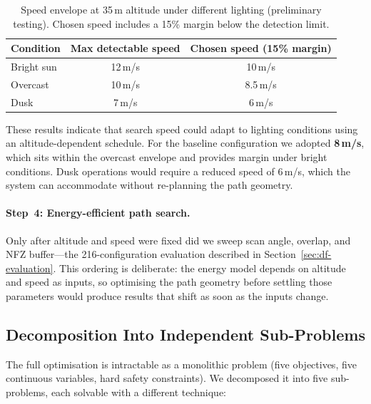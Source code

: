 \begin{table}[H]
  \centering\compactTable
  \caption{Speed envelope at 35\,m altitude under different lighting (preliminary testing). Chosen speed includes a 15\% margin below the detection limit.}\label{tab:df-speed-envelope}
  \begin{tabularx}{\linewidth}{@{}l c c@{}}
    \toprule
    \textbf{Condition} & \textbf{Max detectable speed} & \textbf{Chosen speed (15\% margin)} \\
    \midrule
    Bright sun   & 12\,m/s & 10\,m/s \\
    Overcast     & 10\,m/s & 8.5\,m/s \\
    Dusk         &  7\,m/s & 6\,m/s \\
    \bottomrule
  \end{tabularx}
\end{table}

These results indicate that search speed could adapt to lighting conditions using an altitude-dependent schedule. For the baseline configuration we adopted \textbf{8\,m/s}, which sits within the overcast envelope and provides margin under bright conditions. Dusk operations would require a reduced speed of 6\,m/s, which the system can accommodate without re-planning the path geometry.

\paragraph{Step~4: Energy-efficient path search.}
Only after altitude and speed were fixed did we sweep scan angle, overlap, and NFZ buffer---the 216-configuration evaluation described in Section~\ref{sec:df-evaluation}. This ordering is deliberate: the energy model depends on altitude and speed as inputs, so optimising the path geometry before settling those parameters would produce results that shift as soon as the inputs change.

\subsection{Decomposition Into Independent Sub-Problems}\label{sec:df-decomposition}

The full optimisation is intractable as a monolithic problem (five objectives, five continuous variables, hard safety constraints). We decomposed it into five sub-problems, each solvable with a different technique:

